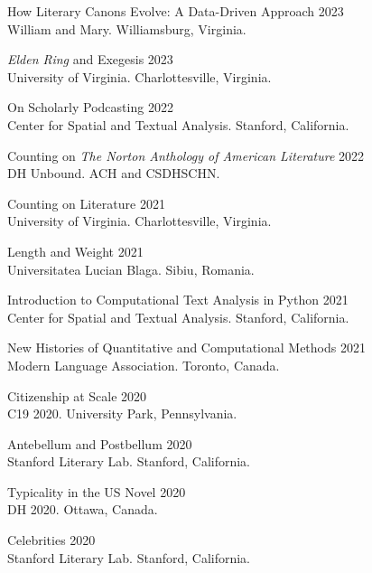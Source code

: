 \documentclass[
  12pt,
  letterpaper,
]{article}
\begin{document}
How Literary Canons Evolve: A Data-Driven Approach \hfill 2023\\
\hspace*{0.333em} William and Mary. Williamsburg, Virginia.

\emph{Elden Ring} and Exegesis \hfill 2023\\
\hspace*{0.333em} University of Virginia. Charlottesville, Virginia.

On Scholarly Podcasting \hfill 2022\\
\hspace*{0.333em} Center for Spatial and Textual Analysis. Stanford,
California.

Counting on \emph{The Norton Anthology of American Literature}
\hfill 2022\\
\hspace*{0.333em} DH Unbound. ACH and CSDH\textbar SCHN.

Counting on Literature \hfill 2021\\
\hspace*{0.333em} University of Virginia. Charlottesville, Virginia.

Length and Weight \hfill 2021\\
\hspace*{0.333em} Universitatea Lucian Blaga. Sibiu, Romania.

Introduction to Computational Text Analysis in Python \hfill 2021\\
\hspace*{0.333em} Center for Spatial and Textual Analysis. Stanford,
California.

New Histories of Quantitative and Computational Methods \hfill 2021\\
\hspace*{0.333em} Modern Language Association. Toronto, Canada.

Citizenship at Scale \hfill 2020\\
\hspace*{0.333em} C19 2020. University Park, Pennsylvania.

Antebellum and Postbellum \hfill 2020\\
\hspace*{0.333em} Stanford Literary Lab. Stanford, California.

Typicality in the US Novel \hfill 2020\\
\hspace*{0.333em} DH 2020. Ottawa, Canada.

Celebrities \hfill 2020\\
\hspace*{0.333em} Stanford Literary Lab. Stanford, California.
\end{document}
